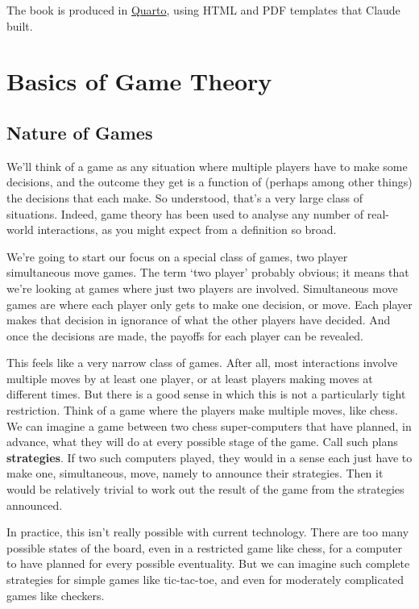 \documentclass[
  11pt,
  letterpaper,
]{scrbook}
\begin{document}
The book is produced in \href{https://quarto.org}{Quarto}, using HTML
and PDF templates that Claude built.


\chapter{Basics of Game Theory}\label{sec-basics}

\section{Nature of Games}\label{sec-nature-of-games}

We'll think of a game as any situation where multiple players have to
make some decisions, and the outcome they get is a function of (perhaps
among other things) the decisions that each make. So understood, that's
a very large class of situations. Indeed, game theory has been used to
analyse any number of real-world interactions, as you might expect from
a definition so broad.

We're going to start our focus on a special class of games, two player
simultaneous move games. The term `two player' probably obvious; it
means that we're looking at games where just two players are involved.
Simultaneous move games are where each player only gets to make one
decision, or move. Each player makes that decision in ignorance of what
the other players have decided. And once the decisions are made, the
payoffs for each player can be revealed.

This feels like a very narrow class of games. After all, most
interactions involve multiple moves by at least one player, or at least
players making moves at different times. But there is a good sense in
which this is not a particularly tight restriction. Think of a game
where the players make multiple moves, like chess. We can imagine a game
between two chess super-computers that have planned, in advance, what
they will do at every possible stage of the game. Call such plans
\textbf{strategies}. If two such computers played, they would in a sense
each just have to make one, simultaneous, move, namely to announce their
strategies. Then it would be relatively trivial to work out the result
of the game from the strategies announced.

In practice, this isn't really possible with current technology. There
are too many possible states of the board, even in a restricted game
like chess, for a computer to have planned for every possible
eventuality. But we can imagine such complete strategies for simple
games like tic-tac-toe, and even for moderately complicated games like
checkers.
\end{document}
